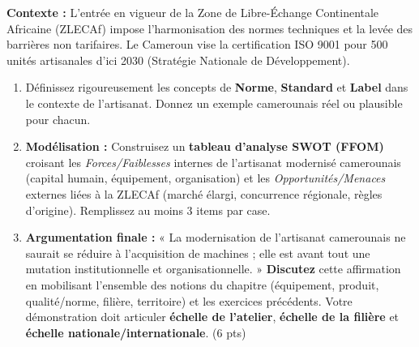 \documentclass[11pt]{article}
\begin{document}
\begin{exercice}
\textbf{Contexte :} L'entrée en vigueur de la Zone de Libre-Échange Continentale Africaine (ZLECAf) impose l'harmonisation des normes techniques et la levée des barrières non tarifaires. Le Cameroun vise la certification ISO 9001 pour 500 unités artisanales d'ici 2030 (Stratégie Nationale de Développement).

\begin{enumerate}
    \item Définissez rigoureusement les concepts de \textbf{Norme}, \textbf{Standard} et \textbf{Label} dans le contexte de l'artisanat. Donnez un exemple camerounais réel ou plausible pour chacun.
    \item \textbf{Modélisation :} Construisez un \textbf{tableau d'analyse SWOT (FFOM)} croisant les \textit{Forces/Faiblesses} internes de l'artisanat modernisé camerounais (capital humain, équipement, organisation) et les \textit{Opportunités/Menaces} externes liées à la ZLECAf (marché élargi, concurrence régionale, règles d'origine). Remplissez au moins 3 items par case.
    \item \textbf{Argumentation finale :} « La modernisation de l'artisanat camerounais ne saurait se réduire à l'acquisition de machines ; elle est avant tout une mutation institutionnelle et organisationnelle. » \textbf{Discutez} cette affirmation en mobilisant l'ensemble des notions du chapitre (équipement, produit, qualité/norme, filière, territoire) et les exercices précédents. Votre démonstration doit articuler \textbf{échelle de l'atelier}, \textbf{échelle de la filière} et \textbf{échelle nationale/internationale}. (6 pts)
\end{enumerate}
\end{exercice}
\end{document}
